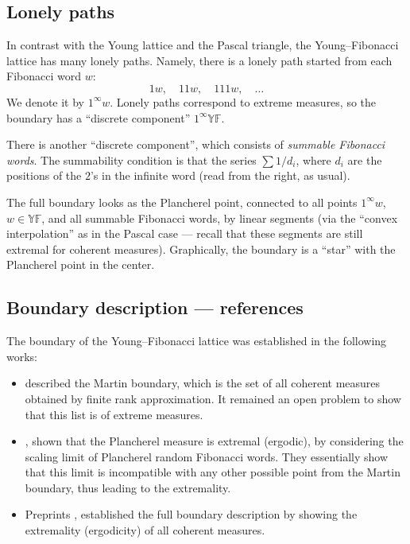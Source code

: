\documentclass[letterpaper,11pt,oneside,reqno]{article}
\numberwithin{equation}{section}
\theoremstyle{definition}
\begin{document}
\subsection{Lonely paths}

In contrast with the Young lattice and the Pascal triangle,
the Young--Fibonacci lattice has many lonely paths.
Namely, there is a lonely path started from each Fibonacci word $w$:
\begin{equation*}
	1w, \quad 11w, \quad 111w, \quad \ldots
\end{equation*}
We denote it by $1^\infty w$.
Lonely paths correspond to extreme measures,
so the boundary has a ``discrete component''
$1^\infty\mathbb{YF}$.

There is another ``discrete component'',
which consists of \emph{summable Fibonacci words}.
The summability condition is that the series
$\sum 1/d_i$, where $d_i$ are the positions of the $2$'s in the infinite word (read from the right, as usual).

The full boundary looks as the Plancherel point,
connected to all points $1^\infty w$, $w\in\mathbb{YF}$, and all summable Fibonacci words,
by linear segments (via the ``convex interpolation'' as in the
Pascal case --- recall that these segments are still extremal
for coherent measures).
Graphically, the boundary is a ``star'' with the Plancherel point
in the center.

\subsection{Boundary description --- references}

The boundary of the Young--Fibonacci lattice
was established in the following works:
\begin{itemize}
	\item \cite{KerovGoodman1997} described the Martin
		boundary, which is the set of all coherent measures
		obtained by finite rank approximation. It remained an
		open problem to show that this list is of extreme measures.
	\item \cite{gnedin2000plancherel}, shown that the Plancherel measure is extremal
		(ergodic), by considering the scaling limit of
		Plancherel random Fibonacci words. They essentially show that this limit is incompatible
		with any other possible point from the Martin boundary, thus
		leading to the extremality.
	\item Preprints
		\cite{BochkovEvtushevsky2020},
		\cite{Evtushevsky2020PartII}
		established the full boundary description by showing
		the extremality (ergodicity) of all coherent measures.
\end{itemize}
\end{document}
